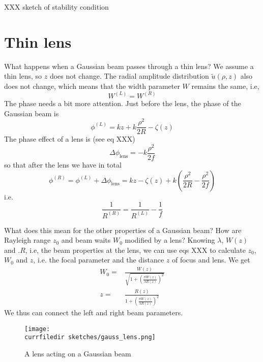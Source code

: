 XXX sketch of stability condition

\section{Thin lens}

What happens when a Gaussian beam passes through a thin lens? We assume a thin lens, so $z$ does not change. The radial amplitude distribution $ \tilde{u}(\rho, z)$ also does not change, which means that the width parameter $W$ remains the same, i.e,
\begin{equation}
    W^{(L)} = W^{(R)}
\end{equation}
The phase needs a bit more attention. Just before the lens, the phase of the Gaussian beam is
\begin{equation}
   \phi^{(L)} =  k z + k  \frac{\rho^2}{2 R}  -  \zeta(z) 
\end{equation}
The phase effect of a lens is (see eq XXX)
\begin{equation}
  \Delta\phi_\text{lens} =   - k \frac{\rho^2}{2f}
\end{equation}
so that after the lens we have in total
\begin{equation}
  \phi^{(R)} =  \phi^{(L)}   + \Delta\phi_\text{lens}  =   k z   -  \zeta(z)  + k  \left( \frac{\rho^2}{2 R} - \frac{\rho^2}{2f} \right)
\end{equation}  
i.e. 
\begin{equation}
    \frac{1}{R^{(R)}} = \frac{1}{R^{(L)}} - \frac{1}{f}
\end{equation}

What does this mean for the other properties of a Gaussian beam? How are Rayleigh range $z_0$ and beam waits $W_0$ modified by a lens? Knowing $\lambda$, $W(z)$ and .$R$, i.e, the beam properties at the lens, we can use eqs XXX to calculate $z_0$, $W_0$ and $z$, i.e. the focal parameter and the distance $z$ of focus and lens. We get
\begin{align}
    W_0 = & \frac{W(z)}{\sqrt{1 + \left(\frac{\pi W(z)}{ \lambda R(z)} \right)^2}} \\
    z = & \frac{R(z)}{1 + \left(\frac{\pi W(z)}{ \lambda R(z)} \right)^2}
\end{align}
We thus can connect the left and right beam parameters.



\begin{figure}
    \texttt{[image: \\currfiledir sketches/gauss\_lens.png]}
   \caption{A lens acting on a Gaussian beam}
\end{figure}


